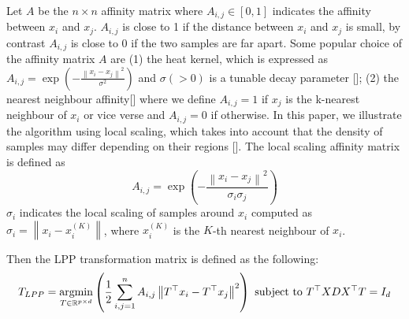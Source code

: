 \documentclass[a4paper,12pt]{article}
\begin{document}
Let $A$ be the $n \times n$ affinity matrix where $A_{i,j} \in [0,1]$ indicates the affinity between $x_{i}$ and $x_{j}$. $A_{i, j}$ is close to 1 if the distance between $x_{i}$ and $x_{j}$ is small, by contrast $A_{i, j}$ is close to 0 if the two samples are far apart. Some popular choice of the affinity matrix $A$ are (1) the heat kernel, which is expressed as $A_{i, j}=\exp \left(-\frac{\left\|x_{i}-x_{j}\right\|^{2}}{\sigma^{2}}\right)$ and $\sigma(>0)$ is a tunable decay parameter [\cite{belkin2003laplacian}]; (2) the nearest neighbour affinity[\cite{roweis2000nonlinear}] where we define $A_{i, j}=1$ if $x_{j}$ is the k-nearest neighbour of $x_{i}$ or vice verse and  $A_{i, j}=0$ if otherwise. In this paper, we illustrate the algorithm using local scaling, which takes into account that the density of samples may differ depending on their regions [\cite{zelnik2005self}]. The local scaling affinity matrix is defined as 
\begin{equation*}
A_{i, j}=\exp \left(-\frac{\left\|x_{i}-x_{j}\right\|^{2}}{\sigma_{i} \sigma_{j}}\right)
\end{equation*}
$\sigma_{i}$ indicates the local scaling of samples around $x_{i}$ computed as $\sigma_{i}=\left\|x_{i}-x_{i}^{(K)}\right\|$, where $x_{i}^{(K)}$ is the $K$-th nearest neighbour of $x_{i}$.

Then the LPP transformation matrix is defined as the following:
\begin{equation*}
T_{L P P} = \underset{T \in \mathbb{R}^{p \times d}}{\operatorname{argmin}}\left(\frac{1}{2} \sum_{i, j=1}^{n} A_{i, j}\left\|T^{\top} x_{i}-T^{\top} x_{j}\right\|^{2}\right) \\
\text { subject to } T^{\top} X D X^{\top} T=I_{d}
\end{equation*}
\end{document}
